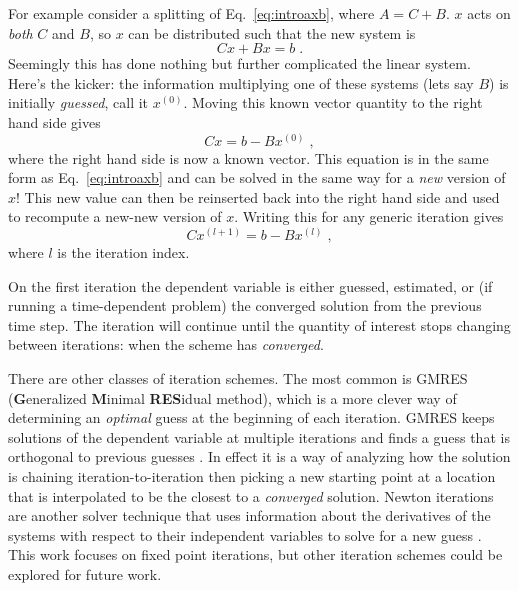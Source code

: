 For example consider a splitting of Eq.~\eqref{eq:introaxb}, where $A = C+B$. $x$ acts on \emph{both} $C$ and $B$, so $x$ can be distributed such that the new system is
\begin{equation}
    Cx + Bx = b \; .
\end{equation}
Seemingly this has done nothing but further complicated the linear system.
Here's the kicker: the information multiplying one of these systems (lets say $B$) is initially \emph{guessed}, call it $x^{(0)}$.
Moving this known vector quantity to the right hand side gives
\begin{equation}
    Cx = b - Bx^{(0)} \; ,
\end{equation}
where the right hand side is now a known vector.
This equation is in the same form as Eq.~\eqref{eq:introaxb} and can be solved in the same way for a \emph{new} version of $x$!
This new value can then be reinserted back into the right hand side and used to recompute a new-new version of $x$.
Writing this for any generic iteration gives
\begin{equation}
\label{eq:introopsplit}
    {C}x^{(l+1)} = b - Bx^{(l)} \; ,
\end{equation}
where $l$ is the iteration index.

On the first iteration the dependent variable is either guessed, estimated, or (if running a time-dependent problem) the converged solution from the previous time step.
The iteration will continue until the quantity of interest stops changing between iterations: when the scheme has \emph{converged}.

There are other classes of iteration schemes. 
The most common is GMRES (\textbf{G}eneralized \textbf{M}inimal \textbf{RES}idual method), which is a more clever way of determining an \emph{optimal} guess at the beginning of each iteration.
GMRES keeps solutions of the dependent variable at multiple iterations and finds a guess that is orthogonal to previous guesses \cite{kylov2004warsa, subspace2004warsa, gmres1996kelley, patton_gmres_2002}.
In effect it is a way of analyzing how the solution is chaining iteration-to-iteration then picking a new starting point at a location that is interpolated to be the closest to a \emph{converged} solution.
Newton iterations are another solver technique that uses information about the derivatives of the systems with respect to their independent variables to solve for a new guess \cite{ctkelle_newton}.
This work focuses on fixed point iterations, but other iteration schemes could be explored for future work.

